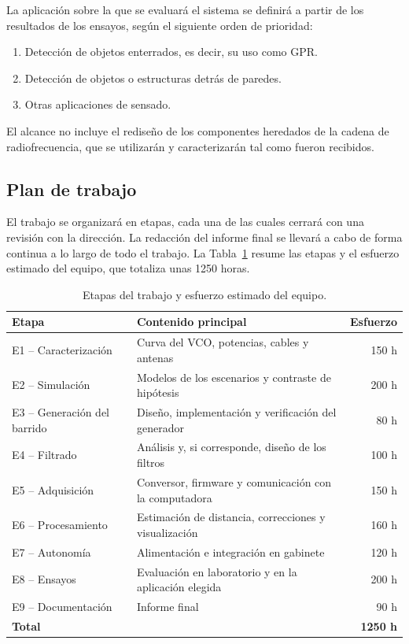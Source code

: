 \documentclass[11pt, a4paper, oneside]{article}
\begin{document}
La aplicación sobre la que se evaluará el sistema se definirá a partir
de los resultados de los ensayos, según el siguiente orden de
prioridad:
\begin{enumerate}
  \item Detección de objetos enterrados, es decir, su uso como GPR.
  \item Detección de objetos o estructuras detrás de paredes.
  \item Otras aplicaciones de sensado.
\end{enumerate}

El alcance no incluye el rediseño de los componentes heredados de la
cadena de radiofrecuencia, que se utilizarán y caracterizarán tal como
fueron recibidos.

\subsection{Plan de trabajo}
\label{sec:plan}

El trabajo se organizará en etapas, cada una de las cuales cerrará con
una revisión con la dirección. La redacción del informe final se
llevará a cabo de forma continua a lo largo de todo el trabajo. La
Tabla~\ref{tab:etapas} resume las etapas y el esfuerzo estimado del
equipo, que totaliza unas 1250 horas.

\begin{table}[htbp]
  \centering
  \small
  \renewcommand{\arraystretch}{1.35}
  \begin{tabularx}{\textwidth}{@{} l X r @{}}
    \toprule
    \textbf{Etapa} & \textbf{Contenido principal} & \textbf{Esfuerzo} \\
    \midrule
    E1 -- Caracterización         & Curva del VCO, potencias, cables y antenas                 & 150 h \\
    E2 -- Simulación              & Modelos de los escenarios y contraste de hipótesis         & 200 h \\
    E3 -- Generación del barrido  & Diseño, implementación y verificación del generador        &  80 h \\
    E4 -- Filtrado                & Análisis y, si corresponde, diseño de los filtros          & 100 h \\
    E5 -- Adquisición             & Conversor, firmware y comunicación con la computadora      & 150 h \\
    E6 -- Procesamiento           & Estimación de distancia, correcciones y visualización      & 160 h \\
    E7 -- Autonomía               & Alimentación e integración en gabinete                     & 120 h \\
    E8 -- Ensayos                 & Evaluación en laboratorio y en la aplicación elegida       & 200 h \\
    E9 -- Documentación           & Informe final                                              &  90 h \\
    \midrule
    \textbf{Total} & & \textbf{1250 h} \\
    \bottomrule
  \end{tabularx}
  \caption{Etapas del trabajo y esfuerzo estimado del equipo.}
  \label{tab:etapas}
\end{table}
\end{document}
